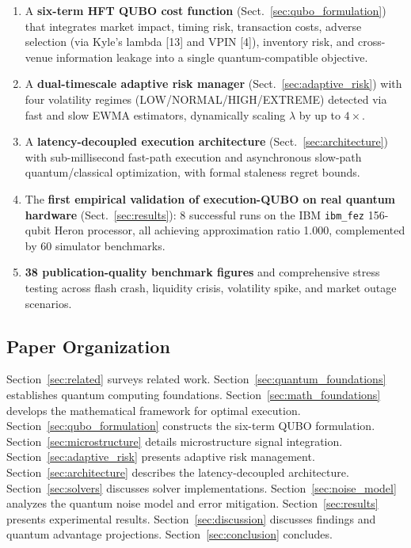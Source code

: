 \documentclass[11pt]{article}
\begin{document}
\begin{enumerate}[leftmargin=*]
\item A \textbf{six-term HFT QUBO cost function} (Sect.~\ref{sec:qubo_formulation}) that integrates market impact, timing risk, transaction costs, adverse selection (via Kyle's lambda [13] and VPIN [4]), inventory risk, and cross-venue information leakage into a single quantum-compatible objective.

\item A \textbf{dual-timescale adaptive risk manager} (Sect.~\ref{sec:adaptive_risk}) with four volatility regimes (LOW/NORMAL/HIGH/EXTREME) detected via fast and slow EWMA estimators, dynamically scaling $\lambda$ by up to $4\times$.

\item A \textbf{latency-decoupled execution architecture} (Sect.~\ref{sec:architecture}) with sub-millisecond fast-path execution and asynchronous slow-path quantum/classical optimization, with formal staleness regret bounds.

\item The \textbf{first empirical validation of execution-QUBO on real quantum hardware} (Sect.~\ref{sec:results}): 8 successful runs on the IBM \texttt{ibm\_fez} 156-qubit Heron processor, all achieving approximation ratio 1.000, complemented by 60 simulator benchmarks.

\item \textbf{38 publication-quality benchmark figures} and comprehensive stress testing across flash crash, liquidity crisis, volatility spike, and market outage scenarios.
\end{enumerate}

\subsection{Paper Organization}
Section~\ref{sec:related} surveys related work. Section~\ref{sec:quantum_foundations} establishes quantum computing foundations. Section~\ref{sec:math_foundations} develops the mathematical framework for optimal execution. Section~\ref{sec:qubo_formulation} constructs the six-term QUBO formulation. Section~\ref{sec:microstructure} details microstructure signal integration. Section~\ref{sec:adaptive_risk} presents adaptive risk management. Section~\ref{sec:architecture} describes the latency-decoupled architecture. Section~\ref{sec:solvers} discusses solver implementations. Section~\ref{sec:noise_model} analyzes the quantum noise model and error mitigation. Section~\ref{sec:results} presents experimental results. Section~\ref{sec:discussion} discusses findings and quantum advantage projections. Section~\ref{sec:conclusion} concludes.
\end{document}
